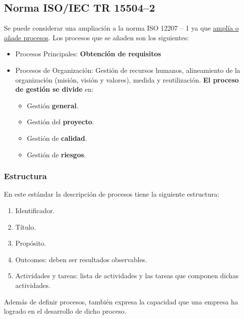 \subsection{Norma ISO/IEC TR 15504--2}
Se puede considerar una ampliación a la norma ISO 12207 – 1 ya que \uline{amplía o añade procesos}. Los procesos que se añaden son los siguientes:



\begin{itemize}
    \item Procesos Principales: \textbf{Obtención de requisitos}
    \item Procesos de Organización: Gestión de recursos humanos, alineamiento de la organización (misión, visión y valores), medida y reutilización. \textbf{El proceso de gestión se divide} en:
    \begin{itemize}
        \item Gestión \textbf{general}.
        \item Gestión del \textbf{proyecto}.
        \item Gestión de \textbf{calidad}.
        \item Gestión de \textbf{riesgos}.
    \end{itemize}
\end{itemize}

\subsubsection{Estructura}
En este estándar la descripción de procesos tiene la siguiente estructura:
\begin{enumerate} %
    \item Identificador. %
    \item Título.%
    \item Propósito.%
    \item Outcomes: deben ser resultados observables.
    \item Actividades y tareas: lista de actividades y las tareas que componen dichas actividades.
\end{enumerate}
Además de definir procesos, también expresa la capacidad que una empresa ha logrado en el desarrollo de dicho proceso.\\



